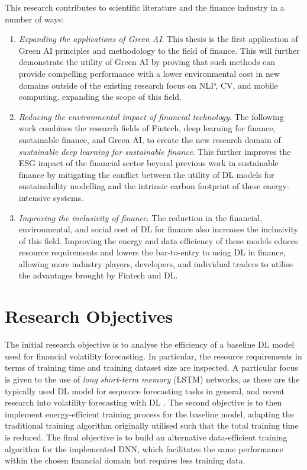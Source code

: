 \documentclass[a4paper, 11pt]{report}
\begin{document}
    This research contributes to scientific literature and the finance industry in a number of ways:

    \begin{enumerate}
        \item \emph{Expanding the applications of Green AI}. This thesis is the first application of Green AI principles and methodology to the field of finance. This will further demonstrate the utility of Green AI by proving that such methods can provide compelling performance with a lower environmental cost in new domains outside of the existing research focus on NLP, CV, and mobile computing, expanding the scope of this field.
        \item \emph{Reducing the environmental impact of financial technology}. The following work combines the research fields of Fintech, deep learning for finance, sustainable finance, and Green AI, to create the new research domain of \emph{sustainable deep learning for sustainable finance}. This further improves the ESG impact of the financial sector beyond previous work in sustainable finance by mitigating the conflict between the utility of DL models for sustainability modelling and the intrinsic carbon footprint of these energy-intensive systems.
        \item \emph{Improving the inclusivity of finance}. The reduction in the financial, environmental, and social cost of DL for finance also increases the inclusivity of this field. Improving the energy and data efficiency of these models educes resource requirements and lowers the bar-to-entry to using DL in finance, allowing more industry players, developers, and individual traders to utilise the advantages brought by Fintech and DL.
    \end{enumerate}


    \section{Research Objectives}

    The initial research objective is to analyse the efficiency of a baseline DL model used for financial volatility forecasting. In particular, the resource requirements in terms of training time and training dataset size are inspected. A particular focus is given to the use of \emph{long short-term memory} (LSTM) networks, as these are the typically used DL model for sequence forecasting tasks in general, and recent research into volatility forecasting with DL \citep{xiong-2015}. The second objective is to then implement energy-efficient training process for the baseline model, adapting the traditional training algorithm originally utilised such that the total training time is reduced. The final objective is to build an alternative data-efficient training algorithm for the implemented DNN, which facilitates the same performance within the chosen financial domain but requires less training data.
\end{document}

